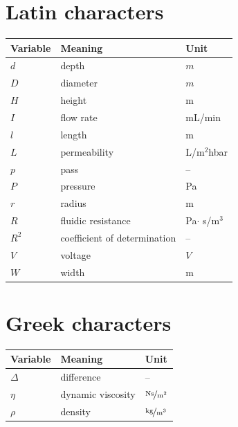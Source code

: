 \documentclass[master,         %
               12pt,           %
               twoside,        %
               BCOR10mm,       %
               ngerman,english%
							 ]{IMTEKda}
\newcommand{\tabheadfont}[1]{\textbf{#1}} %
\newlength\pf
\begin{document}
\cleardoublepage{}
\tableofcontents

\begin{nomenclature}
\section*{Latin characters}
\noindent
\begin{longtable}[l]{p{}p{}p{}}
  \tabheadfont{Variable}&\tabheadfont{Meaning}&\tabheadfont{Unit}\\\midrule\endhead
	$d$ & depth & $\unit{m}$ \\
	$D$ & diameter & $\unit{m}$\\
	$H$ & height & \unit{m} \\
	$I$ & flow rate & \unit{mL/min} \\
	$l$ & length & \unit{m} \\
	$L$ & permeability & \unit{L/m$^2$hbar} \\
	$p$ & pass & -- \\
	$P$ & pressure & \unit{Pa} \\
	$r$ & radius & \unit{m} \\
	$R$ & fluidic resistance & \unit{Pa$\cdot$ s/m${}^3$} \\
	$R^2$ & coefficient of determination & -- \\
	$V$ & voltage & $\unit{V}$ \\
	$W$ & width & \unit{m} \\
\end{longtable}

\section*{Greek characters}
\begin{longtable}[l]{p{}p{}p{}}
  \tabheadfont{Variable}&\tabheadfont{Meaning}&\tabheadfont{Unit}\\\midrule\endhead
	$\Delta$ & difference & -- \\
    $\eta$ & dynamic viscosity & $\unitfrac{N s}{m^2}$ \\
    $\rho$ & density & $\unitfrac{kg}{m^3}$ \\
\end{longtable}



\end{nomenclature}
\end{document}
